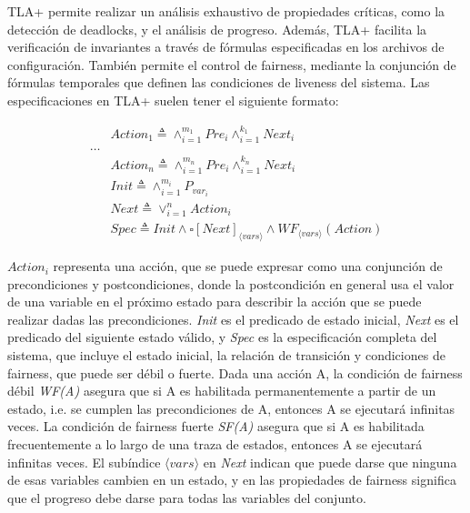 \documentclass[runningheads]{llncs}
\begin{document}
TLA+ permite realizar un análisis exhaustivo de propiedades críticas, como la detección de deadlocks, y el análisis de progreso. Además, TLA+ facilita la verificación de invariantes a través de fórmulas especificadas en los archivos de configuración. También permite el control de fairness, mediante la conjunción de fórmulas temporales que definen las condiciones de liveness del sistema. Las especificaciones en TLA+ suelen tener el siguiente formato:
%
\begin{footnotesize}
\[
\begin{aligned}
    & Action_1 \triangleq \land_{i=1}^{m_1} Pre_i \land_{i=1}^{k_1} Next_i \\
    \dots \\
    & Action_n \triangleq \land_{i=1}^{m_n} Pre_i \land_{i=1}^{k_n} Next_i \\
    & Init \triangleq \land_{i=1}^{m_i} P_{var_i} \\
    & Next \triangleq \lor_{i=1}^{n} Action_i \\
    & Spec \triangleq Init \land \square [Next]_{\langle vars \rangle} \land WF_{\langle vars \rangle}(Action)
\end{aligned}
\]
\end{footnotesize}
%
$Action_{i}$ representa una acción, que se puede expresar como una conjunción de precondiciones y postcondiciones, donde la postcondición en general usa el valor de una variable en el próximo estado para describir la acción que se puede realizar dadas las precondiciones. \textit{Init} es el predicado de estado inicial, \textit{Next} es el predicado del siguiente estado válido, y \textit{Spec} es la especificación completa del sistema, que incluye el estado inicial, la relación de transición y condiciones de fairness, que puede ser débil o fuerte. Dada una acción A, la condición de fairness débil \textit{WF(A)} asegura que si A es habilitada permanentemente a partir de un estado, i.e. se cumplen las precondiciones de A, entonces A se ejecutará infinitas veces. La condición de fairness fuerte \textit{SF(A)} asegura que si A es habilitada frecuentemente a lo largo de una traza de estados, entonces A se ejecutará infinitas veces. El subíndice $\langle vars \rangle$ en \textit{Next} indican que puede darse que ninguna de esas variables cambien en un estado, y en las propiedades de fairness significa que el progreso debe darse para todas las variables del conjunto. 
\end{document}
